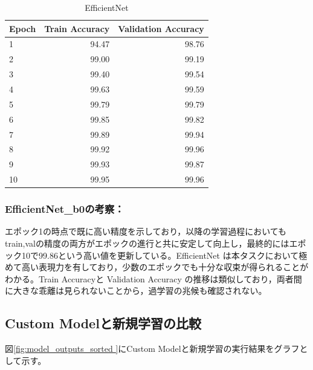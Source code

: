 \documentclass[a4paper,11pt,titlepage]{jsarticle}
\begin{document}
\begin{table}[H]
\centering
\caption{EfficientNet}
\label{tab:efficientnet}
\begin{tabular}{lrr}
\hline
 Epoch &  Train Accuracy &  Validation Accuracy \\
\hline
     1 &           94.47 &                98.76 \\
     2 &           99.00 &                99.19 \\
     3 &           99.40 &                99.54 \\
     4 &           99.63 &                99.59 \\
     5 &           99.79 &                99.79 \\
     6 &           99.85 &                99.82 \\
     7 &           99.89 &                99.94 \\
     8 &           99.92 &                99.96 \\
     9 &           99.93 &                99.87 \\
    10 &           99.95 &                99.96 \\
\hline
\end{tabular}
\end{table}


\subsubsection*{EfficientNet\_b0の考察：}
エポック1の時点で既に高い精度を示しており，以降の学習過程においてもtrain,valの精度の両方がエポックの進行と共に安定して向上し，最終的にはエポック10で99.86という高い値を更新している。EfficientNet は本タスクにおいて極めて高い表現力を有しており，少数のエポックでも十分な収束が得られることがわかる。Train Accuracyと Validation Accuracy の推移は類似しており，両者間に大きな乖離は見られないことから，過学習の兆候も確認されない。

\clearpage

\subsection{Custom Modelと新規学習の比較}
図\ref{fig:model_outputs_sorted }にCustom Modelと新規学習の実行結果をグラフとして示す。
\end{document}
